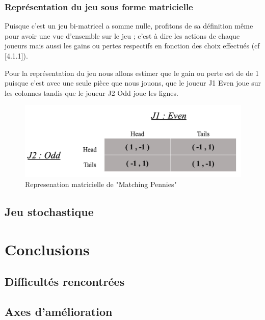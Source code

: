 \documentclass[a4paper, 12pt, twoside]{article}
\begin{document}
\subsubsection{Représentation du jeu sous forme matricielle }
Puisque c'est un jeu bi-matricel a somme nulle, profitons de sa définition même pour avoir une vue d'ensemble sur le jeu ; c'est à dire les actions de chaque joueurs mais aussi les gains ou pertes respectifs en fonction des choix effectués (cf [4.1.1]). \newline

Pour la représentation du jeu nous allons estimer que le gain ou perte est de de 1 puisque c'est avec une seule pièce que nous jouons, que le joueur J1 \textsf{Even} joue sur les colonnes tandis que le joueur J2 \textsf{Odd} joue les lignes.  \vspace{0.4 cm}

\begin{figure}[h!]
\centering
\includegraphics[scale=0.3]{matching.png}
\caption{Represenation matricielle de "Matching Pennies"}
\end{figure}

\subsection{Jeu stochastique}
\newpage
\section{Conclusions}
\subsection{Difficultés rencontrées}
\subsection{Axes d'amélioration}
\newpage
\end{document}
